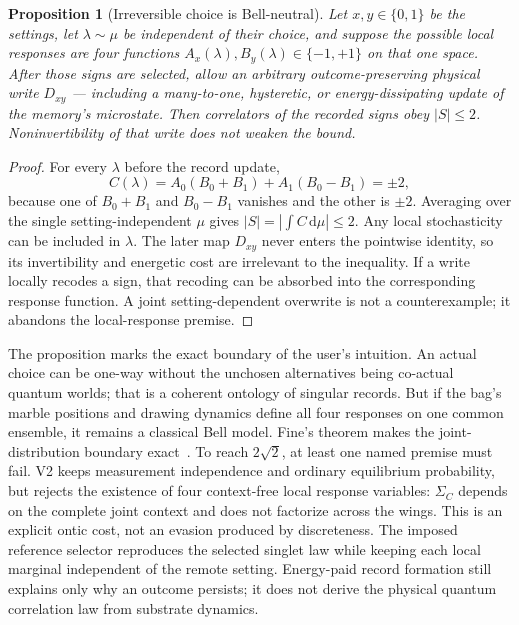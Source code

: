 \documentclass[11pt,a4paper]{article}
\newcommand{\dd}{\mathrm{d}}
\theoremstyle{definition}
\theoremstyle{plain}
\newtheorem{proposition}{Proposition}
\theoremstyle{remark}
\begin{document}
\begin{proposition}[Irreversible choice is Bell-neutral]
\label{prop:irreversiblebell}
Let $x,y\in\{0,1\}$ be the settings, let $\lambda\sim\mu$ be independent of
their choice, and suppose the possible local responses are four functions
$A_x(\lambda),B_y(\lambda)\in\{-1,+1\}$ on that one space. After those
signs are selected, allow an arbitrary \emph{outcome-preserving} physical
write $D_{xy}$ --- including a many-to-one, hysteretic, or
energy-dissipating update of the memory's microstate. Then correlators of
the recorded signs obey $|S|\le2$. Noninvertibility of that write does not
weaken the bound.
\end{proposition}

\begin{proof}
For every $\lambda$ before the record update,
\[
C(\lambda)=A_0(B_0+B_1)+A_1(B_0-B_1)=\pm2,
\]
because one of $B_0+B_1$ and $B_0-B_1$ vanishes and the other is $\pm2$.
Averaging over the single setting-independent $\mu$ gives
$|S|=|\int C\,\dd\mu|\le2$. Any local stochasticity can be included in
$\lambda$. The later map $D_{xy}$ never enters the pointwise identity, so
its invertibility and energetic cost are irrelevant to the inequality. If
a write locally recodes a sign, that recoding can be absorbed into the
corresponding response function. A joint setting-dependent overwrite is
not a counterexample; it abandons the local-response premise.
\end{proof}

The proposition marks the exact boundary of the user's intuition. An
actual choice can be one-way without the unchosen alternatives being
co-actual quantum worlds; that is a coherent ontology of singular records.
But if the bag's marble positions and drawing dynamics define all four
responses on one common ensemble, it remains a classical Bell model. Fine's
theorem makes the joint-distribution boundary exact~\cite{fine}. To reach
$2\sqrt2$, at least one named premise must fail. V2 keeps measurement
independence and ordinary equilibrium probability, but rejects the existence
of four context-free local response variables: $\Sigma_C$ depends on the
complete joint context and does not factorize across the wings. This is an
explicit ontic cost, not an evasion produced by discreteness. The imposed
reference selector reproduces the selected singlet law while keeping each
local marginal independent of the remote setting. Energy-paid record
formation still explains only why an outcome persists; it does not derive the
physical quantum correlation law from substrate dynamics.
\end{document}
